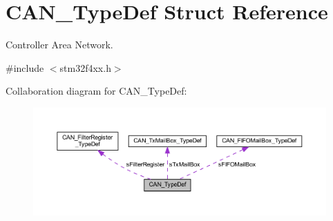 \hypertarget{struct_c_a_n___type_def}{}\section{C\+A\+N\+\_\+\+Type\+Def Struct Reference}
\label{struct_c_a_n___type_def}


Controller Area Network.  




{\ttfamily \#include $<$stm32f4xx.\+h$>$}



Collaboration diagram for C\+A\+N\+\_\+\+Type\+Def\+:
\nopagebreak
\begin{figure}[H]
\begin{center}
\leavevmode
\includegraphics[width=350pt]{struct_c_a_n___type_def__coll__graph}
\end{center}
\end{figure}
